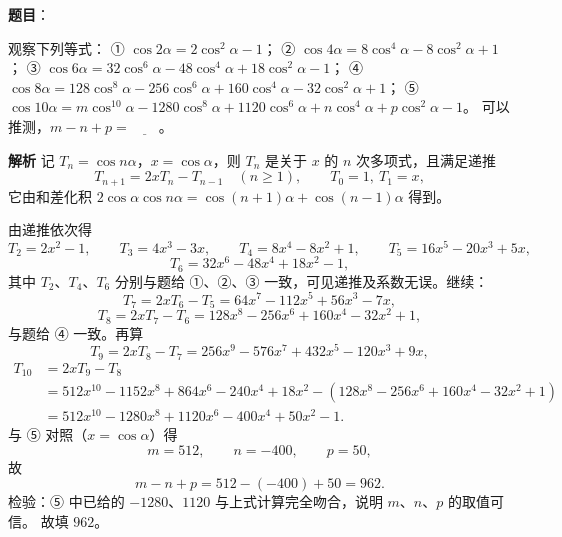 \begin{answer}

\textbf{题目}：

观察下列等式：
① $\cos2\alpha=2\cos^2\alpha-1$；
② $\cos4\alpha=8\cos^4\alpha-8\cos^2\alpha+1$；
③ $\cos6\alpha=32\cos^6\alpha-48\cos^4\alpha+18\cos^2\alpha-1$；
④ $\cos8\alpha=128\cos^8\alpha-256\cos^6\alpha+160\cos^4\alpha-32\cos^2\alpha+1$；
⑤ $\cos10\alpha=m\cos^{10}\alpha-1280\cos^8\alpha+1120\cos^6\alpha+n\cos^4\alpha+p\cos^2\alpha-1$。
可以推测，$m-n+p=\underline{\qquad}$。

\textbf{解析}
记 $T_n=\cos n\alpha$，$x=\cos\alpha$，则 $T_n$ 是关于 $x$ 的 $n$ 次多项式，且满足递推
\nopagebreak[4]
\[T_{n+1}=2xT_n-T_{n-1}\quad(n\geqslant1),\qquad T_0=1,\ T_1=x,\]
它由和差化积 $2\cos\alpha\cos n\alpha=\cos(n+1)\alpha+\cos(n-1)\alpha$ 得到。

由递推依次得
\nopagebreak[4]
\[T_2=2x^2-1,\qquad T_3=4x^3-3x,\qquad T_4=8x^4-8x^2+1,\qquad T_5=16x^5-20x^3+5x,\]
\nopagebreak[4]
\[T_6=32x^6-48x^4+18x^2-1,\]
其中 $T_2$、$T_4$、$T_6$ 分别与题给 ①、②、③ 一致，可见递推及系数无误。继续：
\nopagebreak[4]
\[T_7=2xT_6-T_5=64x^7-112x^5+56x^3-7x,\]
\nopagebreak[4]
\[T_8=2xT_7-T_6=128x^8-256x^6+160x^4-32x^2+1,\]
与题给 ④ 一致。再算
\nopagebreak[4]
\[T_9=2xT_8-T_7=256x^9-576x^7+432x^5-120x^3+9x,\]
\nopagebreak[4]
\[\begin{aligned}
T_{10}&=2xT_9-T_8\\
&=512x^{10}-1152x^8+864x^6-240x^4+18x^2-\left(128x^8-256x^6+160x^4-32x^2+1\right)\\
&=512x^{10}-1280x^8+1120x^6-400x^4+50x^2-1.
\end{aligned}\]
与 ⑤ 对照（$x=\cos\alpha$）得
\nopagebreak[4]
\[m=512,\qquad n=-400,\qquad p=50,\]
故
\nopagebreak[4]
\[m-n+p=512-(-400)+50=962.\]
检验：⑤ 中已给的 $-1280$、$1120$ 与上式计算完全吻合，说明 $m$、$n$、$p$ 的取值可信。
故填 $962$。


\end{answer}
